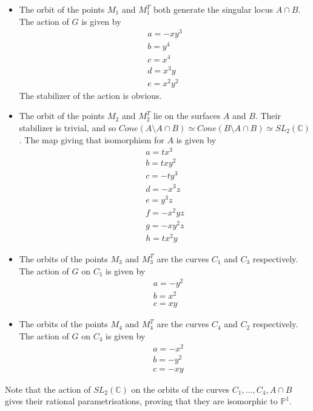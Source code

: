\documentclass{amsart}
\begin{document}
\begin{itemize}
  \item The orbit of the points $M_1$ and $M_1^T$ both generate the singular locus $A \cap B$. The action of $G$ is given by
  \begin{align*}
&  a = -x y^{3}\\
  &b = y^{4}\\
  &c = x^{4}\\
  &d = x^{3} y\\
  &e = x^{2} y^{2}
  &\end{align*}
  The stabilizer of the action is obvious.

  \item The orbit of the points $M_2$ and $M_2^T$ lie on the surfaces $A$ and $B$. Their stabilizer is trivial, and so $Cone(A\setminus A\cap B) \simeq Cone(B \setminus A \cap B) \simeq SL_2(\mathbb{C})$.
  The map giving that isomorphism for $A$ is given by 
  \begin{align*}
&  a = t x^{3}\\
  &b = t x y^{2}\\
  &c = -t y^{3}\\
  &d = -x^{3} z\\
  &e = y^{3} z\\
  &f = -x^{2} y z\\
  &g = -x y^{2} z\\
  &h = t x^{2} y
  &\end{align*}
 \item  The orbits of the points $M_3$ and $M_3^T$ are the curves $C_1$ and $C_3$ respectively. 
  The action of $G$ on $C_1$ is given by
  \begin{align*}
  &a = -y^2\\
  &b = x^2\\
  &c = xy
  \end{align*}

  \item  The orbits of the points $M_4$ and $M_4^T$ are the curves $C_4$ and $C_2$ respectively. 
  The action of $G$ on $C_4$ is given by
  \begin{align*}
  &a = -x^2\\
  &b = -y^2\\
  &c = -xy
  \end{align*}

\end{itemize}

Note that the action of $SL_2(\mathbb{C})$ on the orbits of the curves $C_1, \ldots, C_4, A\cap B$ gives their rational parametrisations, proving that they are isomorphic to $\mathbb{P}^1$.
\end{document}
